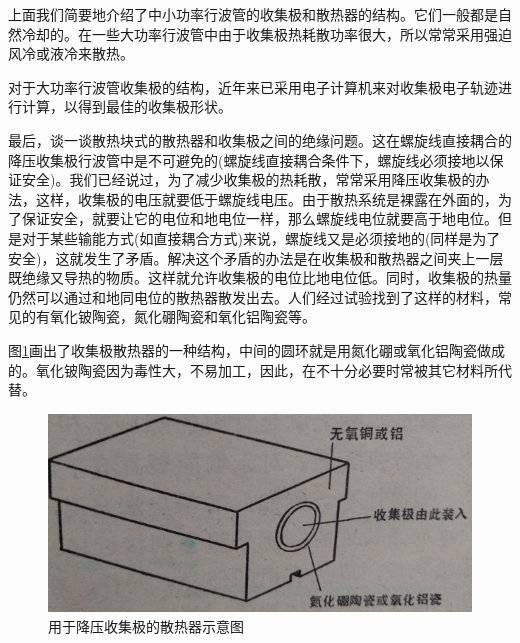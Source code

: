 上面我们简要地介绍了中小功率行波管的收集极和散热器的结构。它们一般都是自然冷却的。在一些大功率行波管中由于收集极热耗散功率很大，所以常常采用强迫风冷或液冷来散热。



对于大功率行波管收集极的结构，近年来已采用电子计算机来对收集极电子轨迹进行计算，以得到最佳的收集极形状。

最后，谈一谈散热块式的散热器和收集极之间的绝缘问题。这在螺旋线直接耦合的降压收集极行波管中是不可避免的(螺旋线直接耦合条件下，螺旋线必须接地以保证安全)。我们已经说过，为了减少收集极的热耗散，常常采用降压收集极的办法，这样，收集极的电压就要低于螺旋线电压。由于散热系统是裸露在外面的，为了保证安全，就要让它的电位和地电位一样，那么螺旋线电位就要高于地电位。但是对于某些输能方式(如直接耦合方式)来说，螺旋线又是必须接地的(同样是为了安全)，这就发生了矛盾。解决这个矛盾的办法是在收集极和散热器之间夹上一层既绝缘又导热的物质。这样就允许收集极的电位比地电位低。同时，收集极的热量仍然可以通过和地同电位的散热器散发出去。人们经过试验找到了这样的材料，常见的有氧化铍陶瓷，氮化硼陶瓷和氧化铝陶瓷等。


图\ref{ch8-5}画出了收集极散热器的一种结构，中间的圆环就是用氮化硼或氧化铝陶瓷做成的。氧化铍陶瓷因为毒性大，不易加工，因此，在不十分必要时常被其它材料所代替。
\begin{figure}[phtb]
	\centering
	\includegraphics[width=0.55\linewidth]{figure/ch8-5}
	\caption{ 用于降压收集极的散热器示意图}
	\label{ch8-5}
\end{figure}



